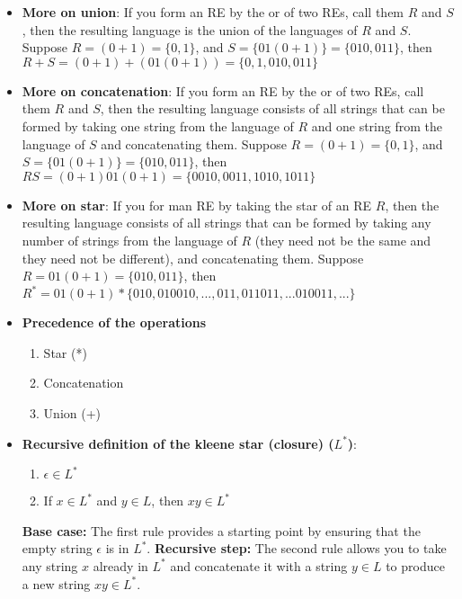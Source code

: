 \documentclass{report}
\begin{document}
\begin{itemize}
        \item \textbf{More on union}:
            If you form an RE by the or of two REs, call them $R$ and $S$, then the resulting language is the union of the languages of $R$ and $S$.
            \bigbreak \noindent 
            Suppose $R = (0+1) = \{0, 1\}$, and $S=\{01(0+1)\}  = \{ 010,011\}$, then $R+S = (0+1) + (01(0+1))  = \{0,1,010, 011\}$
        \item \textbf{More on concatenation}: If you form an RE by the or of two REs, call them $R$ and $S$, then the resulting language consists of all strings that can be formed by taking one string from the language of $R$ and one string from the language of $S$ and concatenating them.
            \bigbreak \noindent 
            Suppose $R = (0+1) = \{0, 1\}$, and $S=\{01(0+1)\}  = \{ 010,011\}$, then $RS = (0+1)01(0+1) = \{0010,0011,1010,1011\}$
        \item \textbf{More on star}: If you for man RE by taking the star of an RE $R$, then the resulting language consists of all strings that can be formed by taking any number of strings from the language of $R$ (they need not be the same and they need not be different), and concatenating them.
            \bigbreak \noindent 
            Suppose $R = 01(0+1) = \{010, 011\}$, then $R^{*} = 01(0+1)* \{010, 010010, ..., 011,011011,... 010011, ...\} $
    \item \textbf{Precedence of the operations}
        \begin{enumerate}
            \item Star (*)
            \item Concatenation
            \item Union (+)
        \end{enumerate}
        \item \textbf{Recursive definition of the kleene star (closure) ($L^{*}$)}:
            \begin{enumerate}
                \item $\epsilon \in L^{*} $
                \item If $x \in L^{*}$ and $y\in L$, then $xy \in L^{*}$
            \end{enumerate}
            \bigbreak \noindent 
            \textbf{Base case:} The first rule provides a starting point by ensuring that the empty string \( \epsilon \) is in \( L^* \).
            \bigbreak \noindent 
            \textbf{Recursive step:} The second rule allows you to take any string \( x \) already in \( L^* \) and concatenate it with a string \( y \in L \) to produce a new string \( xy \in L^* \).

\end{itemize}
\end{document}
